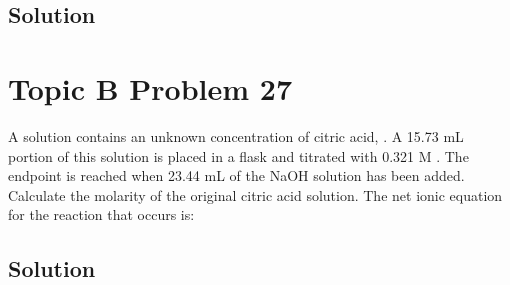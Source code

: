 \documentclass[10pt]{article}
\begin{document}
        \subsection{Solution}

    \pagebreak
    \section{Topic B Problem 27}
        A solution contains an unknown concentration of citric acid, . 
        A 15.73 mL portion of this solution is placed in a flask and titrated with 0.321 M . 
        The endpoint is reached when 23.44 mL of the NaOH solution has been added. 
        Calculate the molarity of the original citric acid solution. 
        The net ionic equation for the reaction that occurs is:
        \begin{center}
        \end{center}


        \subsection{Solution}

    \pagebreak

    \tableofcontents
\end{document}
